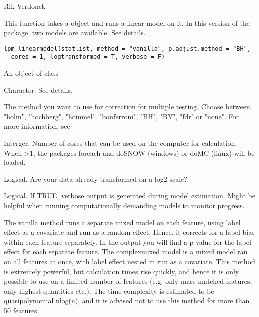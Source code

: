 \documentclass[letterpaper]{book}
\begin{document}
%
\begin{Author}\relax
Rik Verdonck
\end{Author}
%
\begin{Description}\relax
This function takes a  object and runs a linear model on it. In this version of the package, two models are available. See details.
\end{Description}
%
\begin{Usage}
\begin{verbatim}
lpm_linearmodel(statlist, method = "vanilla", p.adjust.method = "BH",
  cores = 1, logtransformed = T, verbose = F)
\end{verbatim}
\end{Usage}
%
\begin{Arguments}
\begin{ldescription}
\item[\code{statlist}] An object of class 

\item[\code{method}] Character. See details.

\item[\code{p.adjust.method}] The method you want to use for correction for multiple testing. Choose between "holm", "hochberg", "hommel", "bonferroni", "BH", "BY", "fdr" or "none". For more information, see 

\item[\code{cores}] Interger. Number of cores that can be used on the computer for calculation. When >1, the packages foreach and doSNOW (windows) or doMC (linux) will be loaded.

\item[\code{logtransformed}] Logical. Are your data already transformed on a log2 scale?

\item[\code{verbose}] Logical. If TRUE, verbose output is generated during model estimation. Might be helpful when running computationally demanding models to monitor progress.
\end{ldescription}
\end{Arguments}
%
\begin{Details}\relax
The vanilla method runs a separate mixed model on each feature, using label effect as a covariate and run as a random effect. Hence, it corrects for a label bias within each feature separately. In the output you will find a p-value for the label effect for each separate feature. The complexmixed model is a mixed model ran on all features at once, with label effect nested in run as a covariate. This method is extremely powerful, but calculation times rise quickly, and hence it is only possible to use on a limited number of features (e.g. only mass matched features, only highest quantities etc.). The time complexity is estimated to be quasipolynomial nlog(n), and it is advised not to use this method for more than 50 features.
\end{Details}
\end{document}
